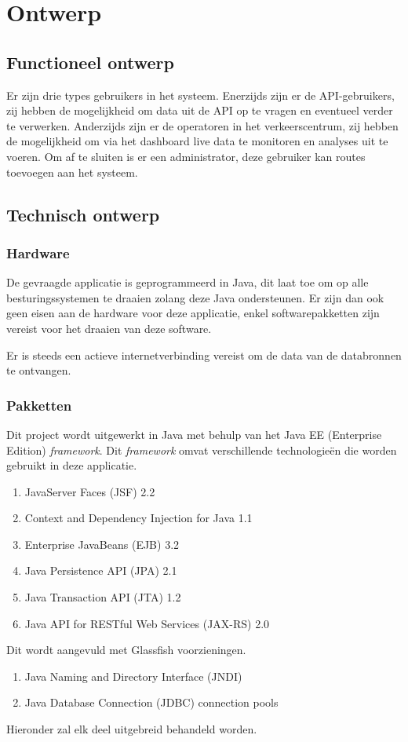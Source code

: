 \documentclass[ps,a4paper,oneside]{report}
\begin{document}
\chapter{Ontwerp}
\section{Functioneel ontwerp}
Er zijn drie types gebruikers in het systeem. Enerzijds zijn er de API-gebruikers, zij hebben de mogelijkheid om data uit de API op te vragen en eventueel verder te verwerken. Anderzijds zijn er de operatoren in het verkeerscentrum, zij hebben de mogelijkheid om via het dashboard live data te monitoren en analyses uit te voeren. Om af te sluiten is er een administrator, deze gebruiker kan routes toevoegen aan het systeem.
\section{Technisch ontwerp}
\subsection{Hardware}
De gevraagde applicatie is geprogrammeerd in Java, dit laat toe om op alle besturingssystemen te draaien zolang deze Java ondersteunen. Er zijn dan ook geen eisen aan de hardware voor deze applicatie, enkel softwarepakketten zijn vereist voor het draaien van deze software.

Er is steeds een actieve internetverbinding vereist om de data van de databronnen te ontvangen.
\subsection{Pakketten}
Dit project wordt uitgewerkt in Java met behulp van het Java EE (Enterprise Edition) \textit{framework}. Dit \textit{framework} omvat verschillende technologie\"en die worden gebruikt in deze applicatie.
\begin{enumerate}	
	\item JavaServer Faces (JSF) 2.2
	\item Context and Dependency Injection for Java 1.1
	\item Enterprise JavaBeans (EJB) 3.2
	\item Java Persistence API (JPA) 2.1
	\item Java Transaction API (JTA) 1.2
	\item Java API for RESTful Web Services (JAX-RS) 2.0
\end{enumerate}
Dit wordt aangevuld met Glassfish voorzieningen.
\begin{enumerate}
	\item Java Naming and Directory Interface (JNDI)
	\item Java Database Connection (JDBC) connection pools
\end{enumerate}
Hieronder zal elk deel uitgebreid behandeld worden.
\end{document}
